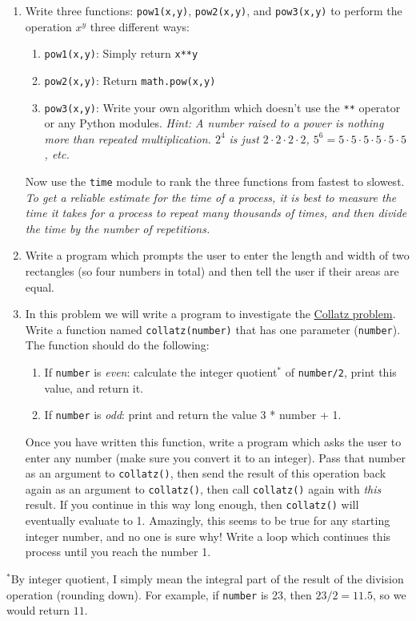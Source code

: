\documentclass{article}
\begin{document}
\begin{enumerate}
	\item Write three functions: \texttt{pow1(x,y)}, \texttt{pow2(x,y)}, and \texttt{pow3(x,y)} to perform the operation $x^y$ three different ways:
	\begin{enumerate}
		\item \texttt{pow1(x,y)}: Simply return \texttt{x**y}
		\item \texttt{pow2(x,y)}: Return \texttt{math.pow(x,y)}
		\item \texttt{pow3(x,y)}: Write your own algorithm which doesn't use the \texttt{**} operator or any Python modules. \textit{Hint: A number raised to a power is nothing more than repeated multiplication. $2^4$ is just $2\cdot2\cdot2\cdot2$, $5^6=5\cdot5\cdot5\cdot5\cdot5\cdot5$, etc.}
	\end{enumerate}
	Now use the \texttt{time} module to rank the three functions from fastest to slowest. \textit{To get a reliable estimate for the time of a process, it is best to measure the time it takes for a process to repeat many thousands of times, and then divide the time by the number of repetitions.}
	\item Write a program which prompts the user to enter the length and width of two rectangles (so four numbers in total) and then tell the user if their areas are equal.
	\item In this problem we will write a program to investigate the \href{https://en.wikipedia.org/wiki/Collatz_conjecture}{Collatz problem}. Write a function named \texttt{collatz(number)} that has one parameter (\texttt{number}). The function should do the following:
	\begin{enumerate}
		\item If \texttt{number} is \textit{even}: calculate the integer quotient$^*$ of \texttt{number/2}, print this value, and return it.
		\item If \texttt{number} is \textit{odd}: print and return the value 3 * number + 1.
	\end{enumerate}
	Once you have written this function, write a program which asks the user to enter any number (make sure you convert it to an integer). Pass that number as an argument to \texttt{collatz()}, then send the result of this operation back again as an argument to \texttt{collatz()}, then call \texttt{collatz()} again with \textit{this} result. If you continue in this way long enough, then \texttt{collatz()} will eventually evaluate to 1. Amazingly, this seems to be true for any starting integer number, and no one is sure why! Write a loop which continues this process until you reach the number 1.
\end{enumerate}
$^*$By integer quotient, I simply mean the integral part of the result of the division operation (rounding down). For example, if \texttt{number} is 23, then $23/2=11.5$, so we would return $11$.
\end{document}

